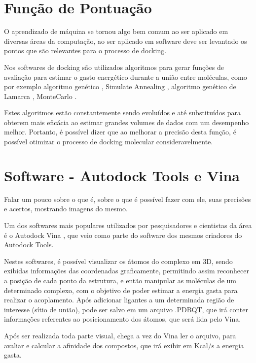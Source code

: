 \documentclass[tcc, capa]{texucpel}
\begin{document}
\section{Função de Pontuação}
O aprendizado de máquina se tornou algo bem comum ao ser aplicado em diversas áreas da computação, ao ser aplicado em software deve ser levantado os pontos que são relevantes para o processo de docking.

Nos softwares de docking são utilizados algoritmos para gerar funções de avaliação para estimar o gasto energético durante a união entre moléculas, como por exemplo algoritmo genético \cite{holland1975adaptation}, Simulate Annealing \cite{kirkpatrick1984optimization} ,  algoritmo genético de Lamarca \cite{morris1998automated},  MonteCarlo \cite{caflisch1992monte}.

Estes algoritmos estão constantemente sendo evoluídos e até substituídos para obterem mais eficácia ao estimar grandes volumes de dados com um desempenho melhor.
Portanto, é possível dizer que ao melhorar a precisão desta função, é possível otimizar o processo de docking molecular consideravelmente.

\section{Software - Autodock Tools e Vina}

Falar um pouco sobre o que é, sobre o que é possível fazer com ele, suas precisões e acertos, mostrando imagens do mesmo.

Um dos softwares mais populares utilizados por pesquisadores e cientistas da área é o Autodock Vina \cite{trott2010autodock}, que veio como parte do software dos mesmos criadores do Autodock Tools.

Nestes softwares, é possível visualizar os átomos do complexo em 3D, sendo exibidas informações das coordenadas graficamente, permitindo assim reconhecer a posição de cada ponto da estrutura, e então manipular as moléculas de um determinado complexo, com o objetivo de poder estimar a energia gasta para realizar o acoplamento. 
Após adicionar ligantes a um determinada região de interesse (sítio de união), pode ser salvo em um arquivo .PDBQT, que irá conter informações referentes ao posicionamento dos átomos, que será lida pelo Vina.

Após ser realizada toda parte visual, chega a vez do Vina ler o arquivo, para avaliar e calcular a afinidade dos compostos, que irá exibir em Kcal/s a energia gasta.
\end{document}
